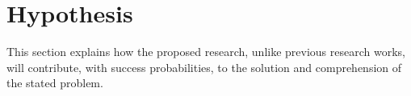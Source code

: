 \section{Hypothesis}
\label{sec:hypothesis}

This section explains how the proposed research, unlike previous research works, will contribute, with success probabilities, to the solution and comprehension of the stated problem.